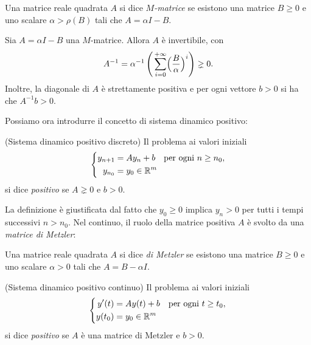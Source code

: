 \begin{defi}
Una matrice reale quadrata $A$ si dice \emph{$M$-matrice} se esistono
una matrice $B \geq 0$ e uno scalare $\alpha > \rho(B)$ tali che $A = \alpha I - B$.
\end{defi}

\begin{teor}
Sia $A = \alpha I - B$ una $M$-matrice. Allora $A$ è invertibile, con
\[
A^{-1} = \alpha^{-1} \left(
	\, \sum_{i=0}^{+\infty} \Bigl( \frac{B}{\alpha} \Bigr)^i
\right) \gneq 0.
\]
Inoltre, la diagonale di $A$ è strettamente positiva e per ogni vettore $b > 0$
si ha che $A^{-1}b > 0$.
\end{teor}

\noindent Possiamo ora introdurre il concetto di sistema dinamico positivo:

\begin{defi}(Sistema dinamico positivo discreto)
Il problema ai valori iniziali
\begin{equation} \label{eq:problema-positivo-discreto}
\left\{
\begin{aligned}
y_{n+1} &= A y_n + b \quad \text{per ogni $n \geq n_0$}, \\
y_{n_0} &= y_0 \in \mathbb{R}^m
\end{aligned}
\right.
\end{equation}
si dice \emph{positivo} se $A \gneq 0$ e $b > 0$.
\end{defi}

\noindent La definizione è giustificata dal fatto che $y_0 \geq 0$ implica
$y_n > 0$ per tutti i tempi successivi $n > n_0$. Nel continuo, il ruolo della
matrice positiva $A$ è svolto da una \emph{matrice di Metzler}:

\begin{defi}
Una matrice reale quadrata $A$ si dice \emph{di Metzler} se esistono
una matrice $B \geq 0$ e uno scalare $\alpha > 0$ tali che $A = B - \alpha I$.
\end{defi}

\begin{defi}(Sistema dinamico positivo continuo)
Il problema ai valori iniziali
\begin{equation} \label{eq:problema-positivo-continuo}
\left\{
\begin{aligned}
y'(t)  &= A y(t) + b \quad \text{per ogni $t \geq t_0$}, \\
y(t_0) &= y_0 \in \mathbb{R}^m
\end{aligned}
\right.
\end{equation}
si dice \emph{positivo} se $A$ è una matrice di Metzler e $b > 0$.
\end{defi}

